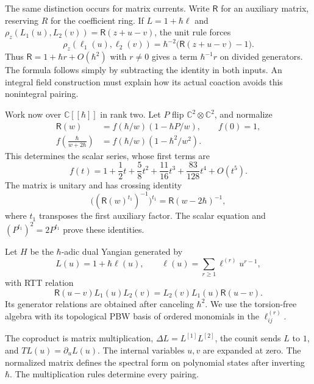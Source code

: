The same distinction occurs for matrix currents.
Write $\mathsf R$ for an auxiliary matrix, reserving $R$ for the
coefficient ring. If $L=1+\hbar\ell$ and
$\rho_z(L_1(u),L_2(v))=\mathsf R(z+u-v)$, the unit rule forces
\begin{equation}\label{cylev:eq:divided-form}
 \rho_z(\ell_1(u),\ell_2(v))
       =\hbar^{-2}\bigl(\mathsf R(z+u-v)-1\bigr).
\end{equation}
Thus $\mathsf R=1+\hbar r+O(\hbar^2)$ with $r\ne0$ gives a
term $\hbar^{-1}r$ on divided generators.
The formula follows simply by subtracting the identity in both inputs.
An integral field construction must explain how its actual coaction
avoids this nonintegral pairing.

Work now over $\mathbb C[[\hbar]]$ in rank two.
Let $P$ flip $\mathbb C^2\otimes\mathbb C^2$, and normalize
\begin{equation}\label{cylev:eq:rtt-normalization}
\begin{split}
 \mathsf R(w)&=f(\hbar/w)(1-\hbar P/w),\qquad f(0)=1,\\
 f\left(\frac{\hbar}{w+2\hbar}\right)
       &=f(\hbar/w)(1-\hbar^2/w^2).
\end{split}
\end{equation}
This determines the scalar series, whose first terms are
\[
 f(t)=1+\frac12t+\frac58t^2+\frac{11}{16}t^3
                         +\frac{83}{128}t^4+O(t^5).
\]
The matrix is unitary and has crossing identity
\begin{equation}\label{cylev:eq:rtt-crossing}
 \bigl((\mathsf R(w)^{t_1})^{-1}\bigr)^{t_1}
       =\mathsf R(w-2\hbar)^{-1},
\end{equation}
where $t_1$ transposes the first auxiliary factor.
The scalar equation and $(P^{t_1})^2=2P^{t_1}$ prove these identities.

Let $H$ be the $\hbar$-adic dual Yangian generated by
\[
 L(u)=1+\hbar\ell(u),\qquad
 \ell(u)=\sum_{r\geq1}\ell^{(r)}u^{r-1},
\]
with RTT relation
\begin{equation}\label{cylev:eq:rtt}
 \mathsf R(u-v)L_1(u)L_2(v)
       =L_2(v)L_1(u)\mathsf R(u-v).
\end{equation}
Its generator relations are obtained after canceling $\hbar^2$.
We use the torsion-free algebra with its topological PBW basis of
ordered monomials in the $\ell_{ij}^{(r)}$.

The coproduct is matrix multiplication, $\Delta L=L^{[1]}L^{[2]}$,
the counit sends $L$ to $1$, and $TL(u)=\partial_uL(u)$.
The internal variables $u,v$ are expanded at zero.
The normalized matrix defines the spectral form on polynomial states
after inverting $\hbar$. The multiplication rules determine every
pairing.

